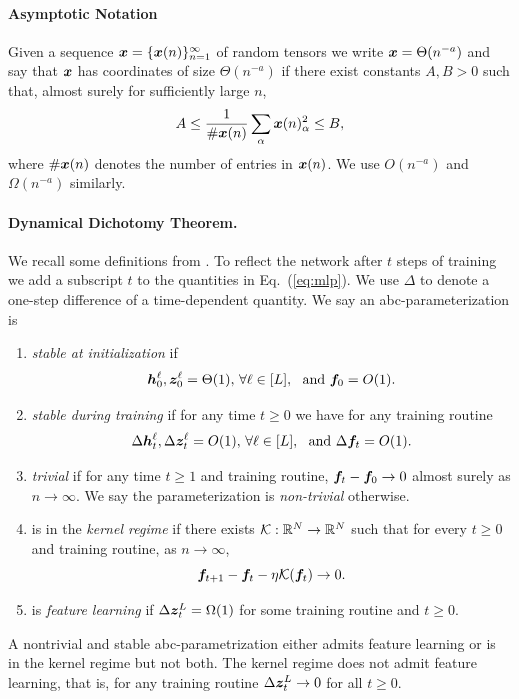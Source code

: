 \paragraph{Asymptotic Notation} 
Given a sequence ${\boldsymbol x} = \{{\boldsymbol x}(n)\}_{n=1}^\infty$ of random tensors we write ${\boldsymbol x} = \Theta(n^{-a})$ and say that ${\boldsymbol x}$ has coordinates of size $\Theta(n^{-a})$ if there exist constants $A, B > 0$ such that, almost surely for sufficiently large $n$,
\[
A \leq \frac{1}{\#{\boldsymbol x}(n)} \sum_{\alpha} {\boldsymbol x}(n)_\alpha^2 \leq B,
\]
where $\#{\boldsymbol x}(n)$ denotes the number of entries in ${\boldsymbol x}(n)$. We use $O(n^{-a})$ and $\Omega(n^{-a})$ similarly.

\paragraph{Dynamical Dichotomy Theorem.} We recall some definitions from \citep{yang2023tensor}. To reflect the network after $t$ steps of training we add a subscript $t$ to the quantities in Eq.\ (\ref{eq:mlp}). We use $\Delta$ to denote a one-step difference of a time-dependent quantity. We say an abc-parameterization is
\begin{enumerate}
    \item \textit{stable at initialization} if 
    \[
        {\boldsymbol h}_0^\ell, {\boldsymbol z}_0^\ell = \Theta(1),\, \forall \ell \in [L],~~\text{and } {\boldsymbol f}_0 = O(1).
    \]

    \item \textit{stable during training} if for any time $t \geq 0$ we have for any training routine
    \[
        \Delta {\boldsymbol h}_t^\ell, \Delta {\boldsymbol z}_t^\ell = O(1),\, \forall \ell \in [L],~~\text{and } \Delta {\boldsymbol f}_t = O(1).
    \]

    \item \textit{trivial} if for any time $t \geq 1$ and training routine, ${\boldsymbol f}_t - {\boldsymbol f}_0 \to 0$ almost surely as $n \to \infty$. We say the parameterization is \textit{non-trivial} otherwise.

    \item is in the \textit{kernel regime} if there exists ${\mathcal K} : \mathbb{R}^N \to \mathbb{R}^N$ such that for every $t \geq 0$ and training routine, as $n \to \infty$,
    \[
        {\boldsymbol f}_{t+1} - {\boldsymbol f}_t - \eta {\mathcal K}({\boldsymbol f}_t) \to 0.
    \]

    \item is \textit{feature learning} if $\Delta {\boldsymbol z}_t^L = \Omega(1)$ for some training routine and $t \geq 0$.
\end{enumerate}
\begin{theorem}\label{thm:dynamical_dichotomy}
A nontrivial and stable abc-parametrization
either admits feature learning or is in the kernel regime  but not both. The kernel regime does not admit feature learning, that is, for any training routine $\Delta {\boldsymbol z}_t^L \to 0$ for all $t \geq 0$.
\end{theorem}

